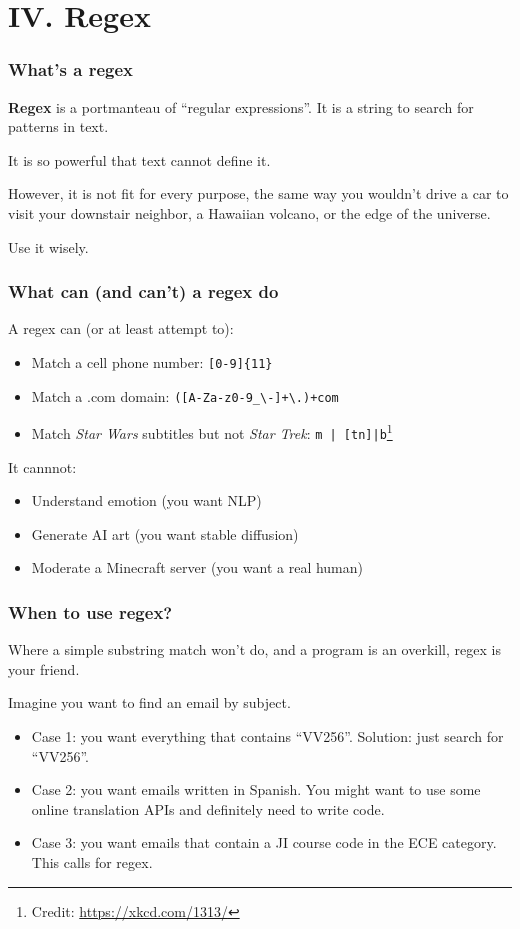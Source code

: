 \section{IV. Regex}
\begin{frame}
\frametitle{What's a regex}
\textbf{Regex} is a portmanteau of ``regular expressions''.
It is a string to search for patterns in text. \newline

It is so powerful that text cannot define it. \newline

However, it is not fit for every purpose, the same way you wouldn't
drive a car to visit your downstair neighbor, a Hawaiian volcano, or
the edge of the universe.\newline

Use it wisely.
\end{frame}

\begin{frame}[fragile]
\frametitle{What can (and can't) a regex do}
A regex can (or at least attempt to):
\begin{itemize}
    \item Match a cell phone number: \verb|[0-9]{11}|
    \item Match a .com domain: \verb|([A-Za-z0-9_\-]+\.)+com|
    \item Match \textit{Star Wars} subtitles but not \textit{Star Trek}:
        \verb!m | [tn]|b!\footnote{Credit: \url{https://xkcd.com/1313/}}
\end{itemize}
It cannnot:
\begin{itemize}
    \item Understand emotion (you want NLP)
    \item Generate AI art (you want stable diffusion)
    \item Moderate a Minecraft server (you want a real human)
\end{itemize}
\end{frame}

\begin{frame}
\frametitle{When to use regex?}
Where a simple substring match won't do, and a program is an overkill, regex is
your friend. \newline

Imagine you want to find an email by subject.
\begin{itemize}
    \item Case 1: you want everything that contains ``VV256''. Solution: just
        search for ``VV256''.
    \item Case 2: you want emails written in Spanish. You might want to use
        some online translation APIs and definitely need to write code.
    \item Case 3: you want emails that contain a JI course code in the ECE
        category. This calls for regex.
\end{itemize}
\end{frame}

